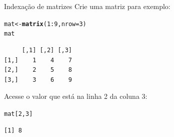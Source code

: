 \documentclass[10pt,handout]{beamer}\usepackage[]{graphicx}\usepackage[]{color}
\makeatletter
\newcommand{\hlnum}[1]{\textcolor[rgb]{0.686,0.059,0.569}{#1}}%
\newcommand{\hlopt}[1]{\textcolor[rgb]{0,0,0}{#1}}%
\newcommand{\hlstd}[1]{\textcolor[rgb]{0.345,0.345,0.345}{#1}}%
\newcommand{\hlkwb}[1]{\textcolor[rgb]{0.69,0.353,0.396}{#1}}%
\newcommand{\hlkwc}[1]{\textcolor[rgb]{0.333,0.667,0.333}{#1}}%
\newcommand{\hlkwd}[1]{\textcolor[rgb]{0.737,0.353,0.396}{\textbf{#1}}}%
\newenvironment{kframe}{%
 \def\at@end@of@kframe{}%
 \ifinner\ifhmode%
  \def\at@end@of@kframe{\end{minipage}}%
  \begin{minipage}{\columnwidth}%
 \fi\fi%
 \def\FrameCommand##1{\hskip\@totalleftmargin \hskip-\fboxsep
 \colorbox{shadecolor}{##1}\hskip-\fboxsep
     \hskip-\linewidth \hskip-\@totalleftmargin \hskip\columnwidth}%
 \MakeFramed {\advance\hsize-\width
   \@totalleftmargin\z@ \linewidth\hsize
   \@setminipage}}%
 {\par\unskip\endMakeFramed%
 \at@end@of@kframe}
\newenvironment{knitrout}{}{} %
\makeatother
\begin{document}
\begin{frame}[fragile]{Indexação de matrizes}
Crie uma matriz para exemplo:
\begin{knitrout}\small
{}\color{fgcolor}\begin{kframe}
\begin{alltt}
\hlstd{mat} \hlkwb{<-} \hlkwd{matrix}\hlstd{(}\hlnum{1}\hlopt{:}\hlnum{9}\hlstd{,} \hlkwc{nrow}\hlstd{=}\hlnum{3}\hlstd{)}
\hlstd{mat}
\end{alltt}
\begin{verbatim}
     [,1] [,2] [,3]
[1,]    1    4    7
[2,]    2    5    8
[3,]    3    6    9
\end{verbatim}
\end{kframe}
\end{knitrout}
Acesse o valor que está na linha 2 da coluna 3:
\begin{knitrout}\small
{}\color{fgcolor}\begin{kframe}
\begin{alltt}
\hlstd{mat[}\hlnum{2}\hlstd{,}\hlnum{3}\hlstd{]}
\end{alltt}
\begin{verbatim}
[1] 8
\end{verbatim}
\end{kframe}
\end{knitrout}
\end{frame}
\end{document}
